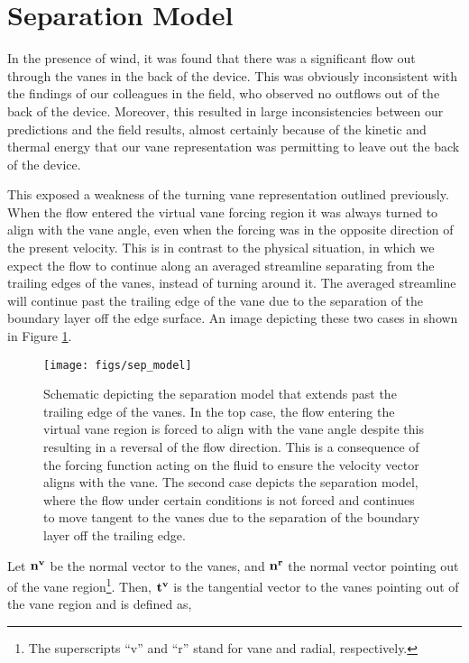 \section{Separation Model}
\label{sec:separation}
In the presence of wind, it was found that there was a significant flow
out through the vanes in the back of the device. This was obviously
inconsistent with the findings of our colleagues in the field, who
observed no outflows out of the back of the device. Moreover, this resulted
in large inconsistencies between our predictions and the field results,
almost certainly because of the kinetic and thermal energy that our vane
representation was permitting to leave out the back of the device.  

This exposed a weakness of the turning vane representation outlined
previously. When the flow entered the virtual vane forcing region it was
always turned to align with the vane angle, even when the forcing was in
the opposite direction of the present velocity.
This is in contrast to the physical situation, in which we
expect the flow to continue along an averaged streamline separating from the 
trailing edges of the vanes, instead of turning around it. 
The averaged streamline will continue past the trailing edge of the vane
due to the separation of the boundary layer off the edge surface. An
image depicting these two cases in shown in Figure \ref{fig:sep_model}.  

\begin{figure}[!htb]
  \begin{center}
    \texttt{[image: figs/sep\_model]}
    \caption{Schematic depicting the separation model that extends past
   the trailing edge of the vanes. In the top case, the flow entering
   the virtual vane region is forced to align with the vane angle despite
   this resulting in a reversal of the flow direction. This is a
   consequence of the forcing function acting on the fluid to ensure the
   velocity vector aligns with the vane. 
   The second case depicts the separation
   model, where the flow under certain conditions is not forced and
   continues to move tangent to the vanes due to 
   the separation of the boundary layer off the trailing edge.} 
    \label{fig:sep_model}
  \end{center}
\end{figure}

Let $\bf n^v$ be the normal vector to the vanes,
and $\bf n^r$ the normal vector pointing out of the vane
region\footnote{\normalsize The superscripts ``v'' and ``r'' stand for
vane and radial, respectively.}.  
Then, $\bf t^v$ is the tangential vector to the vanes pointing out of
the vane region and is defined as,

